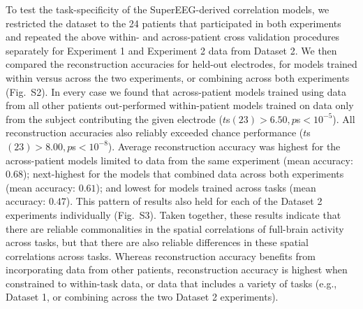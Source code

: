 \documentclass[11pt]{article}
\newcommand{\perexptaskrecon}{S2}
\newcommand{\perexptaskreconseparated}{S3}
\begin{document}
To test the task-specificity of the SuperEEG-derived correlation models, we
restricted the dataset to the 24 patients that participated in both experiments
and repeated the above within- and across-patient cross validation procedures
separately for Experiment 1 and Experiment 2 data from Dataset 2.  We then
compared the reconstruction accuracies for held-out electrodes, for models
trained within versus across the two experiments, or combining across both
experiments (Fig.~\perexptaskrecon).  In every case we found that across-patient
models trained using data from all other patients out-performed within-patient
models trained on data only from the subject contributing the given electrode
($t$s$(23) > 6.50, p$s$ < 10^{-5}$). All reconstruction accuracies also reliably
exceeded chance performance ($t$s$(23) > 8.00, p$s$ < 10^{-8}$).  Average
reconstruction accuracy was highest for the across-patient models limited to
data from the same experiment (mean accuracy: $0.68$); next-highest for the
models that combined data across both experiments (mean accuracy: $0.61$); and
lowest for models trained across tasks (mean accuracy: $0.47$).  This pattern of
results also held for each of the Dataset 2 experiments individually
(Fig.~\perexptaskreconseparated).  Taken together, these results indicate that
there are reliable commonalities in the spatial correlations of full-brain
activity across tasks, but that there are also reliable differences in these
spatial correlations across tasks. Whereas reconstruction accuracy benefits from
incorporating data from other patients, reconstruction accuracy is highest when
constrained to within-task data, or data that includes a variety of tasks (e.g.,
Dataset 1, or combining across the two Dataset 2 experiments).
\end{document}
